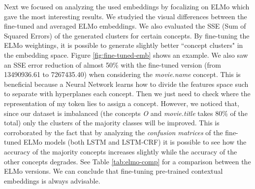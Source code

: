 \documentclass[11pt,a4paper]{article}
\begin{document}
Next we focused on analyzing the used embeddings by focalizing on ELMo which gave the most interesting results. We studyied the visual differences between the fine-tuned and averaged ELMo embeddings. We also evaluated the SSE (Sum of Squared Errors) of the generated clusters for certain concepts. By fine-tuning the ELMo weightings, it is possible to generate slightly better ``concept clusters" in the embedding space. Figure \ref{fig:fine-tuned-emb} shows an example. 
We also saw an SSE error reduction of almost 50\% with the fine-tuned version (from 13490936.61 to 7267435.40) when considering the \textit{movie.name} concept. This is beneficial because a Neural Network learns how to divide the features space such to separate with hyperplanes each concept. Then we just need to check where the representation of my token lies to assign a concept.  However, we noticed that, since our dataset is imbalanced (the concepts \textit{O} and \textit{movie.title} takes 80\% of the total) only the clusters of the majority classes will be improved. This is corroborated by the fact that by analyzing the \textit{confusion matrices} of the fine-tuned ELMo models (both LSTM and LSTM-CRF) it is possible to see how the accuracy of the majority concepts increases slightly while the accuracy of the other concepts degrades. See Table \ref{tab:elmo-comp} for a comparison between the ELMo versions. We can conclude that fine-tuning pre-trained contextual embeddings is always advisable. 

\begin{table}[]
\centering
{}
\caption{Given the top-seven concepts from the test dataset, we compute the tagging accuracy when using the LSTM-CRF and the CHAR+POS+NER features. The first five concepts appear more than 2\% over the entire dataset, while the last two appear less than 1\%. It is possible to see how the performances increase for the first fìive when using the fine-tuned ELMo, while the other two accuracies decrease with respect to the averaged ELMo.}
\label{tab:elmo-comp}
\end{table}
\end{document}
